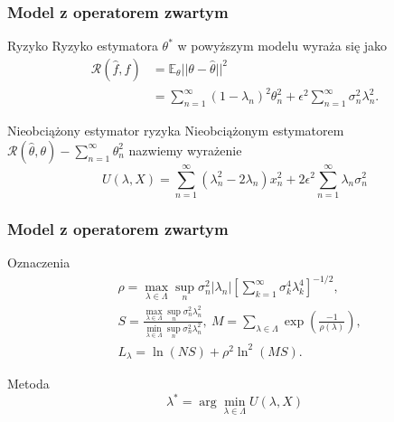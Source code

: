 \documentclass{beamer}
\begin{document}
\begin{frame}\frametitle{Model z operatorem zwartym}
\begin{block}{Ryzyko}
Ryzyko estymatora $\theta^*$ w powyższym modelu wyraża się jako 
\begin{displaymath}
\begin{split}
\mathcal{R}(\hat{f},f)& = \mathbb{E}_{\theta}||\theta-\hat{\theta}||^2  \\
&=\sum_{n=1}^{\infty}(1-\lambda_n)^2\theta_n^2+\epsilon^2\sum_{n=1}^{\infty}\sigma_n^2\lambda_n^2.
\end{split}
\end{displaymath}
\end{block}
\begin{block}{Nieobciążony estymator ryzyka}
Nieobciążonym estymatorem $\mathcal{R}(\hat{\theta},\theta)-\sum_{n=1}^{\infty}\theta_n^2$ nazwiemy wyrażenie
\begin{displaymath}
U(\lambda,X)=\sum_{n=1}^{\infty}(\lambda_n^2-2\lambda_n)x_n^2+2\epsilon^2\sum_{n=1}^{\infty}\lambda_n\sigma_n^2
\end{displaymath}
\end{block}
\end{frame}


\begin{frame}\frametitle{Model z operatorem zwartym}
\begin{block}{Oznaczenia}
\begin{displaymath}
\begin{split}
&\rho=\max_{\lambda\in \Lambda}\sup_n\sigma_n^2|\lambda_n|\left[\sum_{k=1}^{\infty}\sigma_k^4\lambda_k^4\right]^{-1/2},\\
&S=\frac{\max_{\lambda\in\Lambda}\sup_n\sigma_n^2\lambda_n^2}{\min_{\lambda\in \Lambda}\sup_n\sigma_n^2\lambda_n^2},\ M=\sum_{\lambda\in \Lambda}\exp\left(\frac{-1}{\rho(\lambda)}\right),\\
&L_{\lambda}=\ln(NS)+\rho^2\ln^2(MS).
\end{split}
\end{displaymath}
\end{block}
\begin{block}{Metoda}
\begin{displaymath}
\lambda^*=\arg\min_{\lambda\in \Lambda}U(\lambda,X)
\end{displaymath}
\end{block}
\end{frame}
\end{document}
